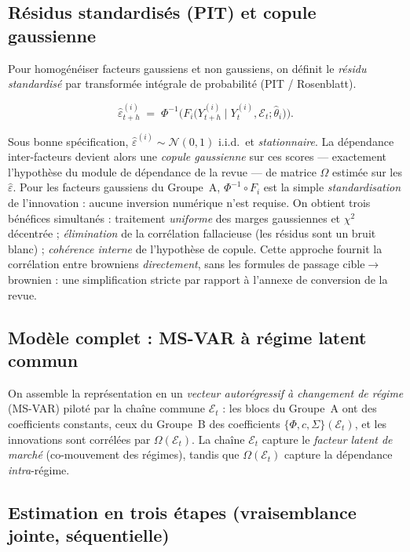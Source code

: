 \documentclass[11pt,a4paper]{article}
\theoremstyle{definition}
\newcommand{\Ecal}{\mathcal{E}}
\newcommand{\Ncal}{\mathcal{N}}
\newcommand{\eps}{\varepsilon}
\begin{document}
\subsection{Résidus standardisés (PIT) et copule gaussienne}
\label{sec:pit}

Pour homogénéiser facteurs gaussiens et non gaussiens, on définit le \emph{résidu standardisé} par transformée intégrale de probabilité (PIT / Rosenblatt).

\begin{definitionbox}
\[
\widehat\eps^{(i)}_{t+h}\;=\;\Phi^{-1}\!\Big(F_i\big(Y^{(i)}_{t+h}\mid Y^{(i)}_t,\Ecal_t;\hat\theta_i\big)\Big).
\]
\end{definitionbox}

\noindent Sous bonne spécification, $\widehat\eps^{(i)}\sim\Ncal(0,1)$ i.i.d.\ et \emph{stationnaire}. La dépendance inter-facteurs devient alors une \emph{copule gaussienne} sur ces scores --- exactement l'hypothèse du module de dépendance de la revue --- de matrice $\Omega$ estimée sur les $\widehat\eps$. Pour les facteurs gaussiens du Groupe~A, $\Phi^{-1}\!\circ F_i$ est la simple \emph{standardisation} de l'innovation : aucune inversion numérique n'est requise. On obtient trois bénéfices simultanés : traitement \emph{uniforme} des marges gaussiennes et $\chi^2$ décentrée ; \emph{élimination} de la corrélation fallacieuse (les résidus sont un bruit blanc) ; \emph{cohérence interne} de l'hypothèse de copule. Cette approche fournit la corrélation entre browniens \emph{directement}, sans les formules de passage cible$\to$brownien : une simplification stricte par rapport à l'annexe de conversion de la revue.

\subsection{Modèle complet : MS-VAR à régime latent commun}

On assemble la représentation en un \emph{vecteur autorégressif à changement de régime} (MS-VAR) piloté par la chaîne commune $\Ecal_t$ : les blocs du Groupe~A ont des coefficients constants, ceux du Groupe~B des coefficients $\{\Phi,c,\Sigma\}(\Ecal_t)$, et les innovations sont corrélées par $\Omega(\Ecal_t)$. La chaîne $\Ecal_t$ capture le \emph{facteur latent de marché} (co-mouvement des régimes), tandis que $\Omega(\Ecal_t)$ capture la dépendance \emph{intra}-régime.

\subsection{Estimation en trois étapes (vraisemblance jointe, séquentielle)}
\end{document}
